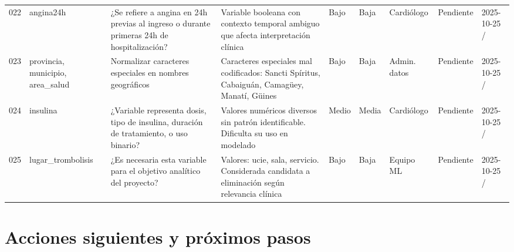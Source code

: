 \documentclass[11pt,a4paper]{article}
\renewcommand{\arraystretch}{1.2}
\begin{document}
\begin{longtable}{@{}L{0.035\textwidth} L{0.10\textwidth} L{0.265\textwidth} L{0.17\textwidth} L{0.05\textwidth} L{0.05\textwidth} L{0.095\textwidth} L{0.065\textwidth} L{0.075\textwidth}@{}}
022 & angina24h & ¿Se refiere a angina en 24h previas al ingreso o durante primeras 24h de hospitalización? & Variable booleana con contexto temporal ambiguo que afecta interpretación clínica & Bajo & Baja & Cardiólogo & Pendiente & 2025-10-25 / \\
023 & provincia, municipio, area\_salud & Normalizar caracteres especiales en nombres geográficos & Caracteres especiales mal codificados: Sancti Sp\'iritus, Cabaigu\'an, Camag\"uey, Manat\'i, G\"uines & Bajo & Baja & Admin. datos & Pendiente & 2025-10-25 / \\
024 & insulina & ¿Variable representa dosis, tipo de insulina, duración de tratamiento, o uso binario? & Valores numéricos diversos sin patrón identificable. Dificulta su uso en modelado & Medio & Media & Cardiólogo & Pendiente & 2025-10-25 / \\
025 & lugar\_trombolisis & ¿Es necesaria esta variable para el objetivo analítico del proyecto? & Valores: ucie, sala, servicio. Considerada candidata a eliminación según relevancia clínica & Bajo & Baja & Equipo ML & Pendiente & 2025-10-25 / \\
\end{longtable}
\renewcommand{\arraystretch}{1.2}
\normalsize


\section*{Acciones siguientes y próximos pasos}
\end{document}

